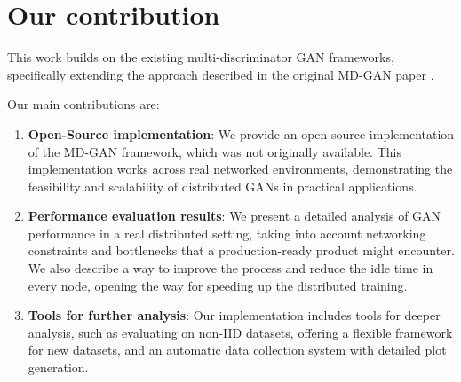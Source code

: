 \section{Our contribution}
This work builds on the existing multi-discriminator GAN frameworks, specifically extending the approach described in the original MD-GAN paper \cite{mdgan}.

Our main contributions are:
\begin{enumerate}
    \item \textbf{Open-Source implementation}: We provide an open-source implementation of the MD-GAN framework, which was not originally available. This implementation works across real networked environments, demonstrating the feasibility and scalability of distributed GANs in practical applications.
    \item \textbf{Performance evaluation results}: We present a detailed analysis of GAN performance in a real distributed setting, taking into account networking constraints and bottlenecks that a production-ready product might encounter. We also describe a way to improve the process and reduce the idle time in every node, opening the way for speeding up the distributed training.
    \item \textbf{Tools for further analysis}: Our implementation includes tools for deeper analysis, such as evaluating on non-IID datasets, offering a flexible framework for new datasets, and an automatic data collection system with detailed plot generation.
\end{enumerate}
